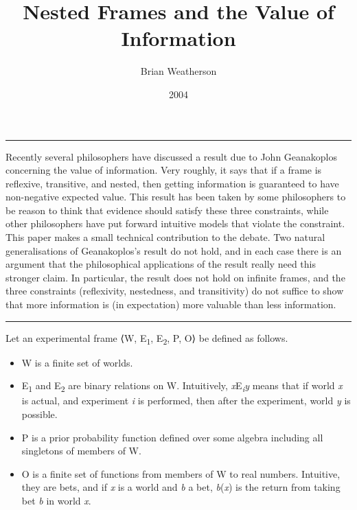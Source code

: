 \documentclass[
  10pt,
  letterpaper,
  DIV=11,
  numbers=noendperiod,
  twoside]{scrartcl}
\title{Nested Frames and the Value of Information}
\author{Brian Weatherson}
\date{2004}
\providecommand{\tightlist}{%
  \setlength{\itemsep}{0pt}\setlength{\parskip}{0pt}}\usepackage{longtable,booktabs,array}
\renewenvironment{abstract}
 {\vspace{-1.25cm}
 \quotation\small\noindent\rule{\linewidth}{.5pt}\par\smallskip
 \noindent }
 {\par\noindent\rule{\linewidth}{.5pt}\endquotation}
\begin{document}
\maketitle
\begin{abstract}
Recently several philosophers have discussed a result due to John
Geanakoplos concerning the value of information. Very roughly, it says
that if a frame is reflexive, transitive, and nested, then getting
information is guaranteed to have non-negative expected value. This
result has been taken by some philosophers to be reason to think that
evidence should satisfy these three constraints, while other
philosophers have put forward intuitive models that violate the
constraint. This paper makes a small technical contribution to the
debate. Two natural generalisations of Geanakoplos's result do not hold,
and in each case there is an argument that the philosophical
applications of the result really need this stronger claim. In
particular, the result does not hold on infinite frames, and the three
constraints (reflexivity, nestedness, and transitivity) do not suffice
to show that more information is (in expectation) more valuable than
less information.
\end{abstract}

Let an experimental frame ⟨W, E\textsubscript{1}, E\textsubscript{2}, P,
O⟩ be defined as follows.

\begin{itemize}
\tightlist
\item
  W is a finite set of worlds.
\item
  E\textsubscript{1} and E\textsubscript{2} are binary relations on W.
  Intuitively, \emph{x}E\textsubscript{\emph{i}}\emph{y} means that if
  world \emph{x} is actual, and experiment \emph{i} is performed, then
  after the experiment, world \emph{y} is possible.
\item
  P is a prior probability function defined over some algebra including
  all singletons of members of W.
\item
  O is a finite set of functions from members of W to real numbers.
  Intuitive, they are bets, and if \emph{x} is a world and \emph{b} a
  bet, \emph{b}(\emph{x}) is the return from taking bet \emph{b} in
  world \emph{x}.
\end{itemize}
\end{document}
